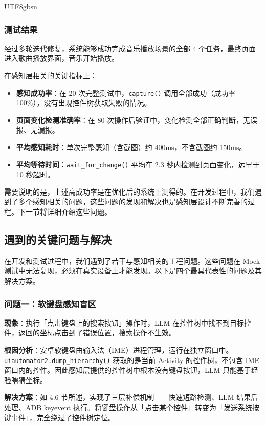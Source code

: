 \documentclass{article}
\begin{document}
\begin{CJK}{UTF8}{gbsn}
\subsubsection{测试结果}

经过多轮迭代修复，系统能够成功完成音乐播放场景的全部 4 个任务，最终页面进入歌曲播放界面，音乐开始播放。

在感知层相关的关键指标上：

\begin{itemize}
  \item \textbf{感知成功率}：在 20 次完整测试中，\texttt{capture()} 调用全部成功（成功率 100\%），没有出现控件树获取失败的情况。
  \item \textbf{页面变化检测准确率}：在 80 次操作后验证中，变化检测全部正确判断，无误报、无漏报。
  \item \textbf{平均感知耗时}：单次完整感知（含截图）约 400ms，不含截图约 150ms。
  \item \textbf{平均等待时间}：\texttt{wait\_for\_change()} 平均在 2.3 秒内检测到页面变化，远早于 10 秒超时。
\end{itemize}

需要说明的是，上述高成功率是在优化后的系统上测得的。在开发过程中，我们遇到了多个感知相关的问题，这些问题的发现和解决也是感知层设计不断完善的过程。下一节将详细介绍这些问题。

\subsection{遇到的关键问题与解决}

在开发和测试过程中，我们遇到了若干与感知相关的工程问题。这些问题在 Mock 测试中无法复现，必须在真实设备上才能发现。以下是四个最具代表性的问题及其解决方案。

\subsubsection{问题一：软键盘感知盲区}

\textbf{现象}：执行「点击键盘上的搜索按钮」操作时，LLM 在控件树中找不到目标控件，返回的坐标点击到了错误位置，搜索操作不生效。

\textbf{根因分析}：安卓软键盘由输入法（IME）进程管理，运行在独立窗口中。\texttt{uiautomator2.dump\_hierarchy()} 获取的是当前 Activity 的控件树，不包含 IME 窗口内的控件。因此感知层提供的控件树中根本没有键盘按钮，LLM 只能基于经验瞎猜坐标。

\textbf{解决方案}：如 4.6 节所述，实现了三层补偿机制——快速短路检测、LLM 结果后处理、ADB keyevent 执行。将键盘操作从「点击某个控件」转变为「发送系统按键事件」，完全绕过了控件树定位。


\end{CJK}
\end{document}
